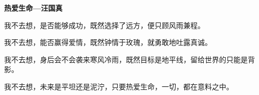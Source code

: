 	
\cnabstract
\begin{center} 
  {\sihao\bfseries 热爱生命---汪国真}\\[3pt]
\end{center} 

我不去想，是否能够成功，既然选择了远方，便只顾风雨兼程。

我不去想，能否赢得爱情，既然钟情于玫瑰，就勇敢地吐露真诚。

我不去想，身后会不会袭来寒风冷雨，既然目标是地平线，留给世界的只能是背影。

我不去想，未来是平坦还是泥泞，只要热爱生命，一切，都在意料之中。





